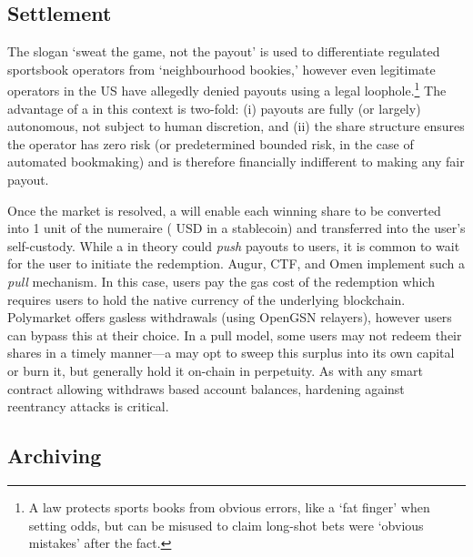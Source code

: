 \subsection{Settlement}\label{wf:clear}

The slogan `sweat the game, not the payout' is used to differentiate regulated sportsbook operators from `neighbourhood bookies,' however even legitimate operators in the US have allegedly denied payouts using a legal loophole.\footnote{A law protects sports books from obvious errors, like a `fat finger' when setting odds, but can be misused to claim long-shot bets were `obvious mistakes' after the fact.} The advantage of a \depm in this context is two-fold: (i) payouts are fully (or largely) autonomous, not subject to human discretion, and (ii) the share structure ensures the operator has zero risk (or predetermined bounded risk, in the case of automated bookmaking) and is therefore financially indifferent to making any fair payout.


Once the market is resolved, a \depm will enable each winning share to be converted into 1 unit of the numeraire ( USD in a stablecoin) and transferred into the user's self-custody. While a \depm in theory could \textit{push} payouts to users, it is common to wait for the user to initiate the redemption. Augur, CTF, and Omen implement such a \textit{pull} mechanism. In this case, users pay the gas cost of the redemption which requires users to hold the native currency of the underlying blockchain. Polymarket offers gasless withdrawals (using OpenGSN relayers), however users can bypass this at their choice. In a pull model, some users may not redeem their shares in a timely manner---a \depm may opt to sweep this surplus into its own capital or burn it, but \depms generally hold it on-chain in perpetuity. As with any smart contract allowing withdraws based account balances, hardening against reentrancy attacks is critical.



\subsection{Archiving}\label{wf:archive}

